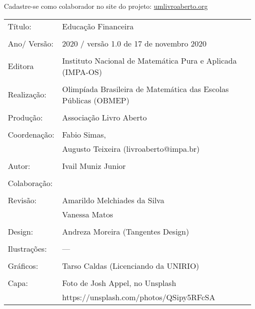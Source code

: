 \vspace*{.3cm}

Cadastre-se como colaborador no site do projeto: \url{umlivroaberto.org}




\begin{tabular}{p{}p{}}
Título: & Educação Financeira\\
\\
Ano/ Versão: & 2020 / versão 1.0 de 17 de novembro 2020\\
\\
Editora & Instituto Nacional de Matem\'atica Pura e Aplicada (IMPA-OS)\\
\\
Realização:& Olimp\'iada Brasileira de Matem\'atica das Escolas P\'ublicas (OBMEP)\\
\\
Produção:& Associação Livro Aberto\\
\\
Coordenação: & Fabio Simas, \\
			&  Augusto Teixeira (livroaberto@impa.br)\\
\\
  Autor: & Ivail Muniz Junior\\
        
\\
Colaboração: & \\
\\
Revisão: & Amarildo Melchiades da Silva \\
         & Vanessa Matos \\
\\
Design: & Andreza Moreira (Tangentes Design) \\
\\
  Ilustrações: & --- \\ 
\\
Gráficos: & Tarso Caldas (Licenciando da UNIRIO)\\
\\
  Capa: & Foto de Josh Appel, no Unsplash \\
  		& https://unsplash.com/photos/QSipy5RFcSA \\

\end{tabular}
\vspace{.5cm}



